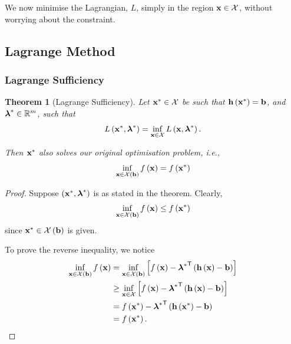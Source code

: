 \documentclass[11pt]{article}
\newtheorem{theorem}{Theorem}[section]
\theoremstyle{definition}
\theoremstyle{remark}
\newcommand{\pqty}[1]{\left(#1\right)}
\newcommand{\bqty}[1]{\left[#1\right]}
\newcommand{\RR}{\mathbb{R}}
\newcommand{\transpose}{^{\mathsf{T}}}
\begin{document}
We now minimise the Lagrangian, \(L\), simply in the region \(\vb{x} \in \mathcal{X}\), without worrying about the constraint.

\subsection{Lagrange Method}
\subsubsection{Lagrange Sufficiency}

\begin{theorem}[Lagrange Sufficiency]\label{optim-unit-0025}
    \label{thm:lagrange-sufficiency}%
    Let \(\vb{x}^{\ast} \in \mathcal{X}\) be such that \(\vb{h}\pqty{\vb{x}^{\ast}} = \vb{b}\), and \(\vb*{\lambda}^{\ast} \in \RR^m\), such that
    \[
        L\pqty{\vb{x}^{\ast}, \vb*{\lambda}^{\ast}} = \inf_{\vb{x} \in \mathcal{X}} L\pqty{\vb{x}, \vb*{\lambda}^{\ast}}.
    \]

    Then \(\vb{x}^{\ast}\) also solves our original optimisation problem, i.e.,
    \[
        \inf_{\vb{x} \in \mathcal{X} \pqty{\vb{b}}} f\pqty{\vb{x}} = f\pqty{\vb{x}^{\ast}}
    \]
\end{theorem}

\begin{proof}
    Suppose \(\pqty{\vb{x}^{\ast}, \vb*{\lambda}^{\ast}}\) is as stated in the theorem. Clearly,
    \[
        \inf_{\vb{x} \in \mathcal{X} \pqty{\vb{b}}} f\pqty{\vb{x}} \leq f\pqty{\vb{x}^{\ast}}
    \]
    since \(\vb{x}^{\ast} \in \mathcal{X} \pqty{\vb{b}}\) is given.
    
    To prove the reverse inequality, we notice
    \begin{align*}
        \inf_{\vb{x} \in \mathcal{X} \pqty{\vb{b}}} f\pqty{\vb{x}} &= \inf_{\vb{x} \in \mathcal{X} \pqty{\vb{b}}} \bqty{f\pqty{\vb{x}} - {\vb*{\lambda}^{\ast}}\transpose \pqty{\vb{h} \pqty{\vb{x}} - \vb{b}}} \\
        &\geq \inf_{\vb{x} \in \mathcal{X}} \bqty{f\pqty{\vb{x}} - {\vb*{\lambda}^{\ast}}\transpose \pqty{\vb{h} \pqty{\vb{x}} - \vb{b}}} \\
        &= f\pqty{\vb{x}^{\ast}} - {\vb*{\lambda}^{\ast}}\transpose \pqty{\vb{h} \pqty{\vb{x}^{\ast}} - \vb{b}} \\
        &= f\pqty{\vb{x}^{\ast}}.
    \end{align*}
\end{proof}
\end{document}
